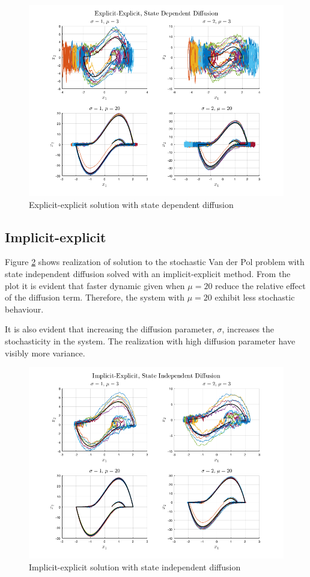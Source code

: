 \begin{figure}[H]
    \centering
    \includegraphics[width=\textwidth]{graphics/opg4/ex_dep.png}
    \caption{Explicit-explicit solution with state dependent diffusion}
    \label{fig4:ex_dep}
\end{figure}

\subsection{Implicit-explicit}
Figure \ref{fig4:im_indep} shows realization of solution to the stochastic Van der Pol problem with state independent diffusion solved with an implicit-explicit method. From the plot it is evident that faster dynamic given when $\mu=20$ reduce the relative effect of the diffusion term. Therefore, the system with $\mu=20$ exhibit less stochastic behaviour.

It is also evident that increasing the diffusion parameter, $\sigma$, increases the stochasticity in the system. The realization with high diffusion parameter have visibly more variance. 

\begin{figure}[H]
    \centering
    \includegraphics[width=\textwidth]{graphics/opg4/im_indep.png}
    \caption{Implicit-explicit solution with state independent diffusion}
    \label{fig4:im_indep}
\end{figure}


